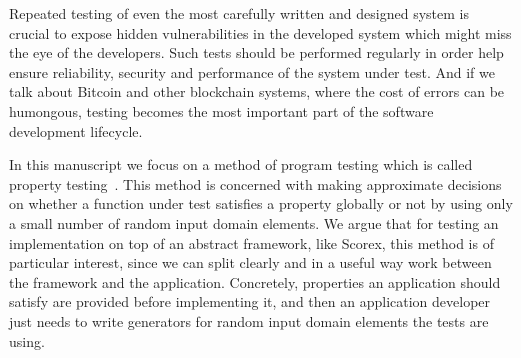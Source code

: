 Repeated testing of even the most carefully written and designed system is crucial to expose hidden vulnerabilities in the developed system which might miss the eye of the developers. Such tests should be performed regularly in order help ensure reliability, security and performance of the system under test. And if we talk about Bitcoin and other blockchain systems, where the cost of errors can be humongous, testing becomes the most important part of the software development lifecycle.

In this manuscript we focus on a method of program testing which is called property testing~\cite{ron2001property}. This method is concerned with making approximate decisions on whether a function under test satisfies a property globally or not by using only a small number of random input domain elements. We argue that for testing an implementation on top of an abstract framework, like Scorex, this method is of particular interest, since we can split clearly and in a useful way work between the framework and the application. Concretely, properties an application should satisfy are provided before implementing it, and then an application developer just needs to write generators for random input domain elements the tests are using.
\nocite{holzmann1995improvement}
\nocite{zaki2008formal}




